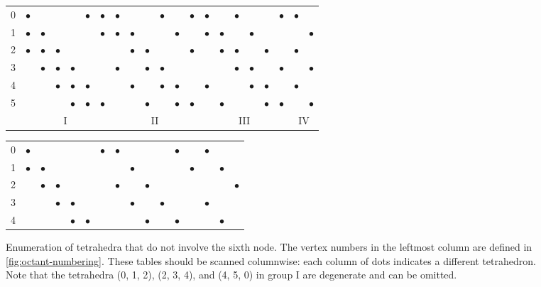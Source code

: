 \documentclass[eikonal.tex]{subfiles}
\begin{document}
\begin{figure}[t]
  \centering
  \begin{tabular}{c|cccccc|cccccc|cccccc|cc}
    0 & $\bullet$ & & & & $\bullet$ & $\bullet$ & $\bullet$ & & & $\bullet$ & & $\bullet$ & $\bullet$ & & $\bullet$ & & & $\bullet$ & $\bullet$ & \\
    1 & $\bullet$ & $\bullet$ & & & & $\bullet$ & $\bullet$ & $\bullet$ & & & $\bullet$ & & $\bullet$ & $\bullet$ & & $\bullet$ & & & & $\bullet$ \\
    2 & $\bullet$ & $\bullet$ & $\bullet$ & & & & & $\bullet$ & $\bullet$ & & & $\bullet$ & & $\bullet$ & $\bullet$ & & $\bullet$ & & $\bullet$ & \\
    3 & & $\bullet$ & $\bullet$ & $\bullet$ & & & $\bullet$ & & $\bullet$ & $\bullet$ & & & & & $\bullet$ & $\bullet$ & & $\bullet$ & & $\bullet$ \\
    4 & & & $\bullet$ & $\bullet$ & $\bullet$ & & & $\bullet$ & & $\bullet$ & $\bullet$ & & $\bullet$ & & & $\bullet$ & $\bullet$ & & $\bullet$ & \\
    5 & & & & $\bullet$ & $\bullet$ & $\bullet$ & & & $\bullet$ & & $\bullet$ & $\bullet$ & & $\bullet$ & & & $\bullet$ & $\bullet$ & & $\bullet$ \\
    \multicolumn{1}{c}{} & \multicolumn{6}{c}{I} & \multicolumn{6}{c}{II} & \multicolumn{6}{c}{III} & \multicolumn{2}{c}{IV}
  \end{tabular}
  \caption{Enumeration of tetrahedra that do not involve the sixth
    node. The vertex numbers in the leftmost column are defined in
    \cref{fig:octant-numbering}. These tables should be scanned
    columnwise: each column of dots indicates a different
    tetrahedron. Note that the tetrahedra (0, 1, 2), (2, 3, 4), and
    (4, 5, 0) in group I are degenerate and can be
    omitted.}\label{fig:olim18-tetrahedra}
  \vspace{1em}
  \begin{tabular}{c|cccccc|cccccc|ccc}
    0 & $\bullet$ & & & & & $\bullet$ & $\bullet$ & & & & $\bullet$ & & $\bullet$ & & \\
    1 & $\bullet$ & $\bullet$ & & & & & & $\bullet$ & & & & $\bullet$ & & $\bullet$ & \\
    2 & & $\bullet$ & $\bullet$ & & & & $\bullet$ & & $\bullet$ & & & & & & $\bullet$ \\
    3 & & & $\bullet$ & $\bullet$ & & & & $\bullet$ & & $\bullet$ & & & $\bullet$ & & \\
    4 & & & & $\bullet$ & $\bullet$ & & & & $\bullet$ & & $\bullet$ & & & $\bullet$ & \\

\end{tabular}
\end{figure}
\end{document}
